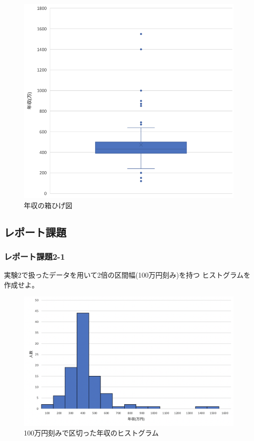 \documentclass[12pt]{jarticle}
\begin{document}
\begin{figure}[t]
    \begin{center}
        \includegraphics[scale=0.7]{kadai4_graph4.png}
    \end{center}
    \caption{年収の箱ひげ図}
    \label{fig4}
\end{figure}
\subsection{レポート課題}
\subsubsection*{レポート課題2-1}
\begin{shadebox}
    実験2で扱ったデータを用いて2倍の区間幅(100万円刻み)を持つ
    ヒストグラムを作成せよ。
\end{shadebox}

\begin{figure}[h]
    \begin{center}
        \includegraphics[scale=0.52]{kadai4_graph5.png}
    \end{center}
    \caption{100万円刻みで区切った年収のヒストグラム}
    \label{fig5}
\end{figure}
\end{document}

